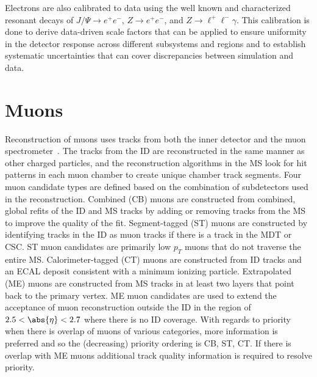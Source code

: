 Electrons are also calibrated to data using the well known and characterized resonant decays of $J/\Psi \to e^{+}e^{-}$, $Z \to e^{+}e^{-}$, and $Z \to \ell^{+}\ell^{-}\gamma$.
This calibration is done to derive data-driven \glspl{scale factor} that can be applied to ensure uniformity in the detector response across different subsystems and regions and to establish systematic uncertainties that can cover discrepancies between simulation and data.

\section{Muons}\label{section:muons}

Reconstruction of muons uses tracks from both the \gls{inner detector} and the \gls{muon spectrometer}~\cite{PERF-2015-10}.
The tracks from the ID are reconstructed in the same manner as other charged particles, and the reconstruction algorithms in the MS look for hit patterns in each muon chamber to create unique chamber track segments.
Four muon candidate types are defined based on the combination of subdetectors used in the reconstruction.
Combined (CB) muons are constructed from combined, global refits of the ID and MS tracks by adding or removing tracks from the MS to improve the quality of the fit.
Segment-tagged (ST) muons are constructed by identifying tracks in the ID as muon tracks if there is a track in the \gls{MDT} or \gls{CSC}.
ST muon candidates are primarily low $p_{T}$ muons that do not traverse the entire MS.
Calorimeter-tagged (CT) muons are constructed from ID tracks and an ECAL deposit consistent with a minimum ionizing particle.
Extrapolated (ME) muons are constructed from MS tracks in at least two layers that point back to the primary vertex.
ME muon candidates are used to extend the acceptance of muon reconstruction outside the ID in the region of $2.5 < \abs{\eta} < 2.7$ where there is no ID coverage.
With regards to priority when there is overlap of muons of various categories, more information is preferred and so the (decreasing) priority ordering is CB, ST, CT.
If there is overlap with ME muons additional track quality information is required to resolve priority.

